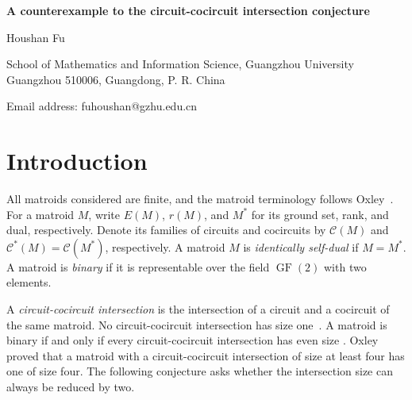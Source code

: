 \documentclass[11pt]{article}
\numberwithin{equation}{section}
\DeclareMathOperator{\GF}{GF}
\begin{document}
\begin{center}
{\Large\bfseries
A counterexample to the circuit-cocircuit intersection conjecture
}
\end{center}

\begin{center}
Houshan Fu\par

School of Mathematics and Information Science, Guangzhou University\\
Guangzhou 510006, Guangdong, P. R. China\par

Email address: fuhoushan@gzhu.edu.cn
\end{center}

\begin{abstract}
Oxley conjectured that a matroid with a circuit-cocircuit intersection of
size $k\geq 4$ has one of size $k-2$.
Using the standard polynomial representation of the classical extended
binary Golay code, we construct an identically self-dual binary matroid of
rank $12$ on $24$ elements. Its circuit-cocircuit intersection sizes are
exactly $0,2,4,6,8$, and $12$, disproving the conjecture for $k=12$.
The proof is self-contained and does not rely on the full weight distribution
of the code or on an enumeration of all circuits.
\par\smallskip
\noindent\textbf{Keywords:} Binary matroid; circuit; cocircuit; circuit-cocircuit intersection 
\par\smallskip
\noindent\textbf{Mathematics Subject Classification:}  05B35
\end{abstract}

\section{Introduction}
All matroids considered are finite, and the matroid terminology follows
Oxley~\cite{Oxley2011}. For a matroid $M$, write $E(M)$, $r(M)$, and $M^*$
for its ground set, rank, and dual, respectively. Denote its families of
circuits and cocircuits by $\mathcal C(M)$ and
$\mathcal C^*(M)=\mathcal C(M^*)$, respectively.
A matroid $M$ is \emph{identically self-dual} if $M=M^*$.
A matroid is \emph{binary} if it is representable over the field
$\GF(2)$ with two elements.

A \emph{circuit-cocircuit intersection} is the intersection of a circuit
and a cocircuit of the same matroid. No circuit-cocircuit intersection has
size one~\cite[Proposition~2.1.11]{Oxley2011}. A matroid is binary if and
only if every circuit-cocircuit intersection has even size
\cite[Theorem~9.1.2]{Oxley2011}.
Oxley~\cite[Theorem~2.7]{Oxley1984} proved that a matroid with a circuit-cocircuit
intersection of size at least four has one of size four.
The following conjecture asks whether the intersection size can always
be reduced by two.
\end{document}
